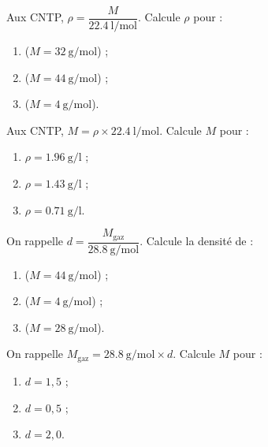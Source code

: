 \documentclass[11pt,a4paper]{article}
\begin{document}
\begin{exo}
Aux CNTP, $\rho=\dfrac{M}{\qty{22.4}{\litre\per\mole}}$. Calcule $\rho$ pour :
\begin{enumerate}[label=\alph*)]
  \item {} ($M=\qty{32}{\gram\per\mole}$) ;
  \item {} ($M=\qty{44}{\gram\per\mole}$) ;
  \item {} ($M=\qty{4}{\gram\per\mole}$).
\end{enumerate}
\end{exo}

\begin{exo}
Aux CNTP, $M=\rho\times\qty{22.4}{\litre\per\mole}$. Calcule $M$ pour :
\begin{enumerate}[label=\alph*)]
  \item $\rho=\qty{1.96}{\gram\per\litre}$ ;
  \item $\rho=\qty{1.43}{\gram\per\litre}$ ;
  \item $\rho=\qty{0.71}{\gram\per\litre}$.
\end{enumerate}
\end{exo}

\begin{exo}
On rappelle $d=\dfrac{M_{\text{gaz}}}{\qty{28.8}{\gram\per\mole}}$. Calcule la densité de :
\begin{enumerate}[label=\alph*)]
  \item {} ($M=\qty{44}{\gram\per\mole}$) ;
  \item {} ($M=\qty{4}{\gram\per\mole}$) ;
  \item {} ($M=\qty{28}{\gram\per\mole}$).
\end{enumerate}
\end{exo}

\begin{exo}
On rappelle $M_{\text{gaz}}=\qty{28.8}{\gram\per\mole}\times d$. Calcule $M$ pour :
\begin{enumerate}[label=\alph*)]
  \item $d=1{,}5$ ;
  \item $d=0{,}5$ ;
  \item $d=2{,}0$.
\end{enumerate}
\end{exo}
\end{document}
